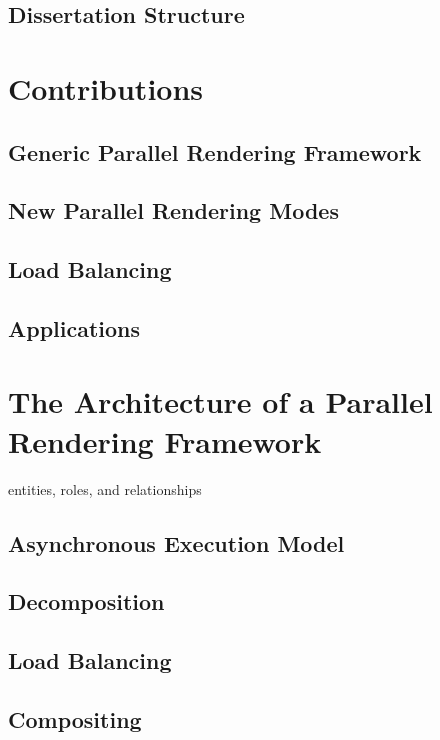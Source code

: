 \subsection{Dissertation Structure}


\section{Contributions}

\subsection{Generic Parallel Rendering Framework}

\subsection{New Parallel Rendering Modes}

\subsection{Load Balancing}

\subsection{Applications}


\section{The Architecture of a Parallel Rendering Framework}

entities, roles, and relationships

\subsection{Asynchronous Execution Model}

\subsection{Decomposition}

\subsection{Load Balancing}

\subsection{Compositing}


